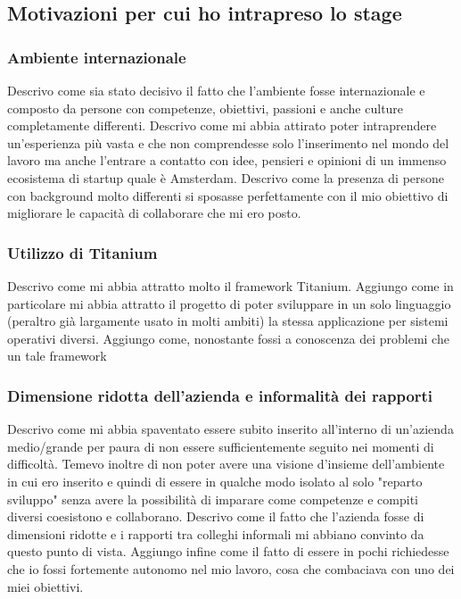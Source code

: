 		\subsection{Motivazioni per cui ho intrapreso lo stage}
			\subsubsection{Ambiente internazionale}
				Descrivo come sia stato decisivo il fatto che l'ambiente fosse internazionale e composto da persone con competenze,
				obiettivi, passioni e anche culture completamente differenti. Descrivo come mi abbia attirato poter intraprendere
				un'esperienza più vasta e che non comprendesse solo l'inserimento nel mondo del lavoro ma anche l'entrare a contatto
				con idee, pensieri e opinioni di un immenso ecosistema di startup quale è Amsterdam. Descrivo come la presenza di
				persone con background molto differenti si sposasse perfettamente con il mio obiettivo di migliorare le capacità di
				collaborare che mi ero posto.
			\subsubsection{Utilizzo di Titanium}
				Descrivo come mi abbia attratto molto il framework Titanium. Aggiungo come in particolare mi abbia attratto il
				progetto di poter sviluppare in un solo linguaggio (peraltro già largamente usato in molti ambiti) la stessa
				applicazione per sistemi operativi diversi. Aggiungo come, nonostante fossi a conoscenza dei problemi che un tale
				framework 
			\subsubsection{Dimensione ridotta dell'azienda e informalità dei rapporti}
				Descrivo come mi abbia spaventato essere subito inserito all'interno di un'azienda medio/grande per paura di non
				essere sufficientemente seguito nei momenti di difficoltà. Temevo inoltre di non poter avere una visione d'insieme
				dell'ambiente in cui ero inserito e quindi di essere in qualche modo isolato al solo "reparto sviluppo" senza avere
				la possibilità di imparare come competenze e compiti diversi coesistono e collaborano. Descrivo come il fatto che
				l'azienda fosse di dimensioni ridotte e i rapporti tra colleghi informali mi abbiano convinto da questo punto di
				vista. Aggiungo infine come il fatto di essere in pochi richiedesse che io fossi fortemente autonomo nel mio lavoro,
				cosa che combaciava con uno dei miei obiettivi.
